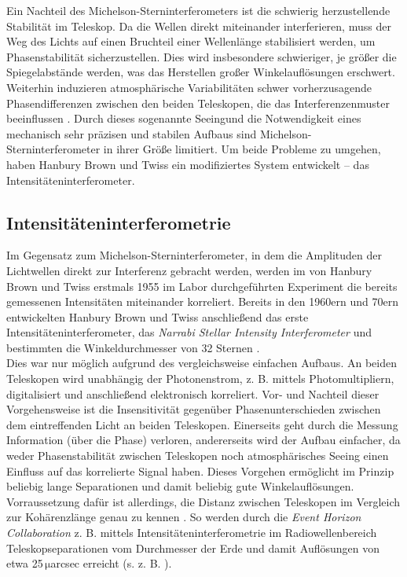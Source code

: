 Ein Nachteil des Michelson-Sterninterferometers ist die schwierig herzustellende Stabilität im Teleskop. 
Da die Wellen direkt miteinander interferieren, muss der Weg des Lichts auf einen Bruchteil einer Wellenlänge stabilisiert werden, um Phasenstabilität sicherzustellen. 
Dies wird insbesondere schwieriger, je größer die Spiegelabstände werden, was das Herstellen großer Winkelauflösungen erschwert. 
Weiterhin induzieren atmosphärische Variabilitäten schwer vorherzusagende Phasendifferenzen zwischen den beiden Teleskopen, die das Interferenzenmuster beeinflussen \cite[Kap. 2]{brownIntensityInterferometerIts1974}. 
Durch dieses sogenannte \glqq Seeing\grqq\;und die Notwendigkeit eines mechanisch sehr präzisen und stabilen Aufbaus sind Michelson-Sterninterferometer in ihrer Größe limitiert. 
Um beide Probleme zu umgehen, haben Hanbury Brown und Twiss ein modifiziertes System entwickelt -- das Intensitäteninterferometer.

\subsection{Intensitäteninterferometrie}
\label{ssec:Intensitäteninterferometrie}
Im Gegensatz zum Michelson-Sterninterferometer, in dem die Amplituden der Lichtwellen direkt zur Interferenz gebracht werden, werden im von Hanbury Brown und Twiss erstmals 1955 im Labor durchgeführten Experiment \cite{brownCorrelationPhotonsTwo1956} die bereits gemessenen Intensitäten miteinander korreliert. 
Bereits in den 1960ern und 70ern entwickelten Hanbury Brown und Twiss anschließend das erste Intensitäteninterferometer, das \emph{Narrabi Stellar Intensity Interferometer} und bestimmten die Winkeldurchmesser von 32 Sternen \cite[Kap. 1]{brownIntensityInterferometerIts1974}. \\
Dies war nur möglich aufgrund des vergleichsweise einfachen Aufbaus. 
An beiden Teleskopen wird unabhängig der Photonenstrom, z. B. mittels Photomultipliern, digitalisiert und anschließend elektronisch korreliert. 
Vor- und Nachteil dieser Vorgehensweise ist die Insensitivität gegenüber Phasenunterschieden zwischen dem eintreffenden Licht an beiden Teleskopen. 
Einerseits geht durch die Messung Information (über die Phase) verloren, andererseits wird der Aufbau einfacher, da weder Phasenstabilität zwischen Teleskopen noch atmosphärisches Seeing einen Einfluss auf das korrelierte Signal haben.
Dieses Vorgehen ermöglicht im Prinzip beliebig lange Separationen und damit beliebig gute Winkelauflösungen. 
Vorraussetzung dafür ist allerdings, die Distanz zwischen Teleskopen im Vergleich zur Kohärenzlänge genau zu kennen \cite{foellmiIntensityInterferometrySecondorder2009}. 
So werden durch die \emph{Event Horizon Collaboration} z. B. mittels Intensitäteninterferometrie im Radiowellenbereich Teleskopseparationen vom Durchmesser der Erde und damit Auflösungen von etwa 25\,$\mathrm{\mu}$arcsec erreicht (s. z. B. \cite{collaborationFirstSagittariusEvent2022}). \\

